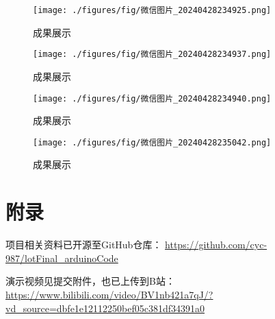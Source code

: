 \documentclass[12pt,hyperref,a4paper,UTF8]{ctexart}
\begin{document}
\begin{figure}[htbp]
  \centering
  \begin{minipage}{0.48\textwidth}
    \texttt{[image: ./figures/fig/微信图片\_20240428234925.png]}
    \caption{成果展示}
  \end{minipage}
  \begin{minipage}{0.48\textwidth}
    \texttt{[image: ./figures/fig/微信图片\_20240428234937.png]}
    \caption{成果展示}
  \end{minipage}
  \begin{minipage}{0.48\textwidth}
    \texttt{[image: ./figures/fig/微信图片\_20240428234940.png]}
    \caption{成果展示}
  \end{minipage}
  \begin{minipage}{0.46\textwidth}
    \texttt{[image: ./figures/fig/微信图片\_20240428235042.png]}
    \caption{成果展示}
  \end{minipage}

\end{figure}




\newpage


\appendix
\section{附录}
项目相关资料已开源至GitHub仓库：
\url{https://github.com/cyc-987/lotFinal_arduinoCode}


演示视频见提交附件，也已上传到B站：
\url{https://www.bilibili.com/video/BV1nb421a7qJ/?vd_source=dbfe1e12112250bef05c381df34391a0}

\end{document}
